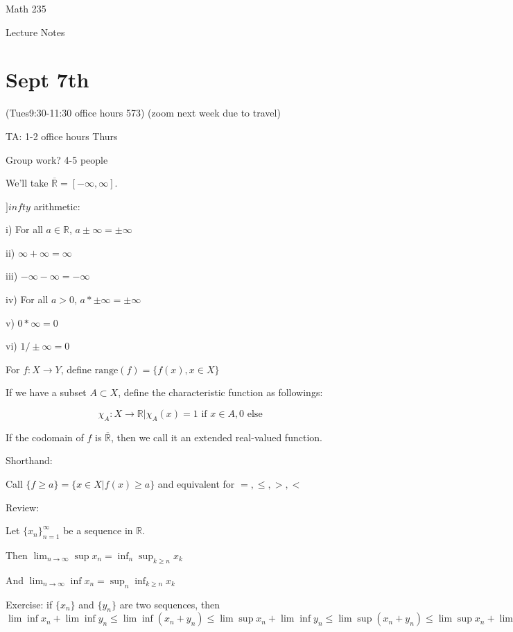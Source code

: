 \documentclass[10pt]{article}
\begin{document}
\begin{Large}
\centerline{Math 235}
\centerline{Lecture Notes}  %
\centerline{\bf }       %
\centerline{}      %
\end{Large}


\vspace{2em}
\section*{Sept 7th}
(Tues9:30-11:30 office hours 573) (zoom next week due to travel)

TA: 1-2 office hours Thurs

Group work? 4-5 people

We'll take $\overline{\mathbb{R}} = [-\infty,\infty]$.

$]infty$ arithmetic:

i) For all $a \in \mathbb{R}$, $a\pm \infty = \pm \infty$

ii) $\infty + \infty = \infty$

iii) $-\infty - \infty = -\infty$

iv) For all $a > 0$, $a* \pm \infty = \pm \infty$

v) $0* \infty = 0$

vi) $1/\pm\infty = 0$

For $f: X \rightarrow Y$, define $\text{range}(f) = \{ f(x) , x \in X \} $

If we have a subset $A \subset X$, define the characteristic function as followings:

$$\chi_A: X \rightarrow \mathbb{R} | \chi_A(x) = 1 \text{ if } x \in A, 0 \text{ else}$$

If the codomain of $f$ is $\overline{\mathbb{R}}$, then we call it an extended real-valued function.

Shorthand:

Call $\{ f\geq a\} = \{ x \in X | f(x) \geq a\}$ and equivalent for $=, \leq, >, <$

Review:

Let $\{ x_n\}_{n=1}^{\infty}$ be a sequence in $\mathbb{R}$.

Then $\lim_{n \rightarrow\infty}\sup x_n = \inf_n \sup_{k \geq n} x_k$

And $\lim_{n \rightarrow\infty}\inf x_n = \sup_n \inf_{k \geq n} x_k$

Exercise: if $\{ x_n \}$ and $\{ y_n \}$ are two sequences, then $\lim\inf x_n + \lim \inf y_n \leq \lim \inf (x_n + y_n) \leq \lim \sup x_n + \lim\inf y_n \leq \lim\sup (x_n + y_n) \leq \lim\sup x_n + \lim\sup y_n$
\end{document}
